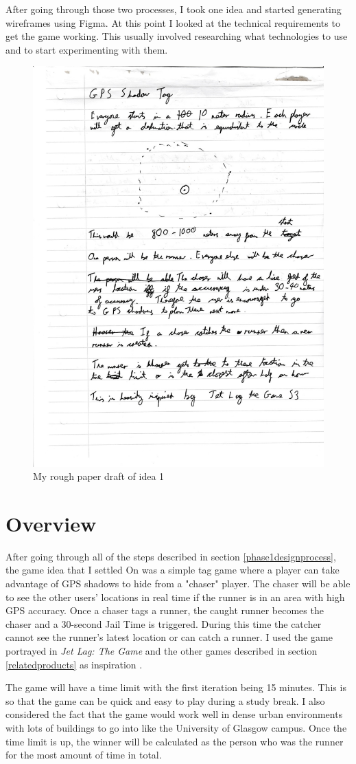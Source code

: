 \documentclass{l4proj}
\begin{document}
After going through those two processes, I took one idea and started generating wireframes using Figma. At this point I
looked at the technical requirements to get the game working. This usually involved researching what technologies to
use and to start experimenting with them.

\begin{figure}
    \centering
    \includegraphics[width=0.5\linewidth]{images/idea1.pdf} 
    \caption{My rough paper draft of idea 1}
    \label{fig:idea1}
\end{figure}

\section{Overview}
\label{game-overview}
After going through all of the steps described in section \ref{phase1designprocess}, the game idea that I settled On
was a simple tag game where a player can take advantage of GPS shadows to hide from
a "chaser" player. The chaser will be able to see the other users' locations in real time if the runner is in an area with
high GPS accuracy. Once a chaser tags a runner, the caught runner becomes the chaser and a 30-second Jail Time is
triggered. During this time the catcher cannot see the runner's latest location or can catch a runner. I used
the game portrayed in \emph{Jet Lag: The Game} and the other games described in section \ref{relatedproducts} as inspiration \citep{Chase2022}.

The game will have a time limit with the first iteration being 15 minutes. This is so that the game can be quick and
easy to play during a study break. I also considered the fact that the game would work well in dense urban environments
with lots of buildings to go into like the University of Glasgow campus. Once the time limit is up, the winner will
be calculated as the person who was the runner for the most amount of time in total.
\end{document}
